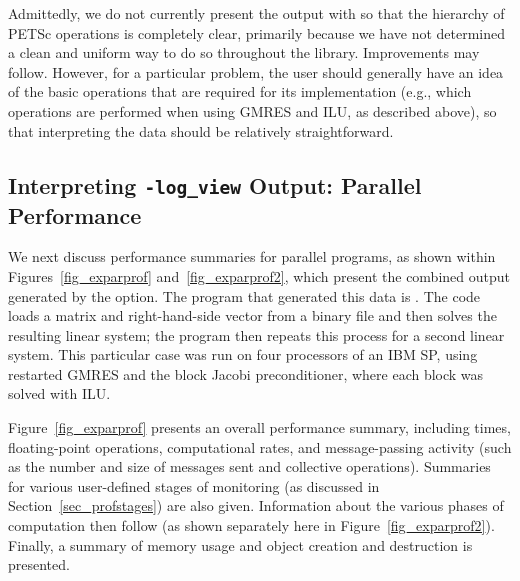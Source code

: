 Admittedly, we do not currently present the output with
 so that the hierarchy of PETSc operations is completely
clear, primarily because we have not determined a clean and uniform
way to do so throughout the library.  Improvements may follow.
However, for a particular problem, the user should generally have
an idea of the basic operations that are required for its
implementation (e.g., which operations are performed when using GMRES
and ILU, as described above), so that interpreting the 
data should be relatively straightforward.

\subsection{Interpreting {\tt -log\_view} Output: Parallel Performance}
\label{sec_parperformance}

We next discuss performance summaries for parallel programs,
 as shown within Figures~\ref{fig_exparprof}
and~\ref{fig_exparprof2}, which present the combined output generated by
the  option.  The program that generated this data is
\href{http://www.mcs.anl.gov/petsc/petsc-current/src/ksp/ksp/examples/tutorials/ex10.c.html}{}.  
The code loads a
matrix and right-hand-side vector from a binary file and then solves
the resulting linear system; the program then repeats this process for
a second linear system.  This particular case was run on four
processors of an IBM SP, using restarted GMRES and the block Jacobi
preconditioner, where each block was solved with ILU.

Figure~\ref{fig_exparprof} presents an overall performance summary,
including times, floating-point operations, computational rates, and
message-passing activity (such as the number and size of messages sent
and collective operations).  Summaries for various user-defined stages
of monitoring (as discussed in Section~\ref{sec_profstages}) are also
given. Information about the various phases of computation then follow
(as shown separately here in Figure~\ref{fig_exparprof2}).
Finally, a summary of memory usage and object creation and destruction
is presented.


